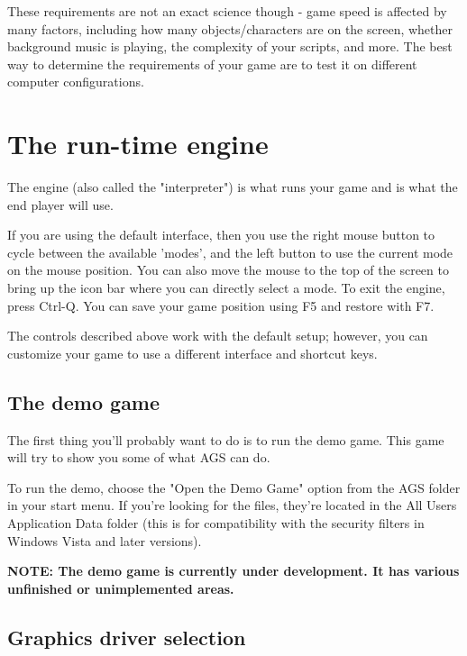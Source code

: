 These requirements are not an exact science though - game speed is affected by many
factors, including how many objects/characters are on the screen, whether background music
is playing, the complexity of your scripts, and more. The best way to determine the requirements
of your game are to test it on different computer configurations.


\chapter{The run-time engine}%

The engine (also called the "interpreter") is what runs your game and is what
the end player will use.

If you are using the default interface, then you use the right mouse button to
cycle between the available 'modes', and the left button to use the current
mode on the mouse position. You can also move the mouse to the top of the
screen to bring up the icon bar where you can directly select a mode.
To exit the engine, press Ctrl-Q. You can save your game position using F5
and restore with F7.

The controls described above work with the default setup; however, you can
customize your game to use a different interface and shortcut keys.


\section{The demo game}%

The first thing you'll probably want to do is to run the demo game. This
game will try to show you some of what AGS can do.

To run the demo, choose the "Open the Demo Game" option from the AGS folder
in your start menu. If you're looking for the files, they're located in the
All Users Application Data folder (this is for compatibility with the security
filters in Windows Vista and later versions).

\bf{NOTE:} The demo game is currently under development. It has various unfinished
or unimplemented areas.



\section{Graphics driver selection}\label{GraphicsDriver}%

